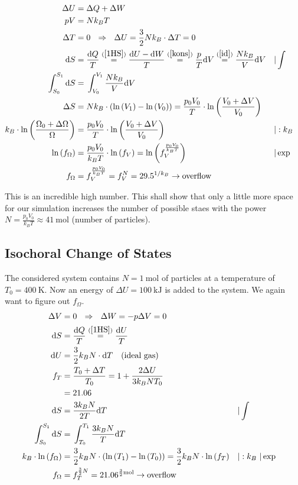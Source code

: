 \documentclass[11pt,a4paper]{scrartcl}
\newcommand{\dd}{\text{d}} 							%
\newcommand{\D}{\Delta} 								%
\newcommand{\Ln}[1]{\text{ln}\left( #1 \right)}			%
\newcommand{\eref}[1]{(\ref{#1})}						%
\begin{document}
\begin{align}
\D U 
	=&\; \D Q + \D W
	\label{1HS}\\
pV 
	=&\; Nk_BT
	\label{id}\\
\D T 
	=&\; 0 
	\ \ \Rightarrow \ \ \D U 
	= \frac{3}{2}Nk_B\cdot \D T
	= 0
	\label{kons}\\
\dd S 
	=&\; \frac{\dd Q}{T} 
	\stackrel{\eref{1HS}}{=} \frac{\dd U-\dd W}{T} 
	\stackrel{\eref{kons}}{=} \frac{p}{T}\dd V 
	\stackrel{\eref{id}}{=} \frac{Nk_B}{V}\dd V 
	&&|\int
	\label{dS}\\
\int_{S_0}^{S_1} \dd S
	=&\; \int_{V_0}^{V_1}\frac{Nk_B}{V}\dd V
	\label{sint}\\
\D S 
	=&\; Nk_B\cdot\left(\Ln{V_1}-\Ln{V_0}\right) 
	=\frac{p_0V_0}{T}\cdot\Ln{\frac{V_0+\D V}{V_0}}
	\label{DS}\\
k_B\cdot \Ln{\frac{\Omega_0+\D \Omega}{\Omega}} 
	=&\;\frac{p_0V_0}{T}\cdot\Ln{\frac{V_0+\D V}{V_0}} 
	&&|:k_B
	\label{SO}\\
\Ln{f_\Omega} 
	=&\; \frac{p_0V_0}{k_BT}\cdot\Ln{f_V} 
	=\Ln{f_V^{\frac{p_0V_0}{k_BT}}} 
	&&|\exp
	\label{lnO}\\
f_\Omega 
	=&\; f_V^{\frac{p_0V_0}{k_BT}} 
	= f_V^N 
	= 29.5^{1/k_B} 
	\rightarrow \text{overflow}
	\label{Omega}
\end{align}

This is an incredible high number. 
This shall show that only a little more space for our simulation increases the number of possible staes with the power $N = \frac{p_0V_0}{k_BT}\approx\SI{41}{\mole}$ (number of particles). 

\subsection{Isochoral Change of States}

The considered system contains $N=\SI{1}{\mole}$ of particles at a temperature of $T_0=\SI{400}{\kelvin}$. Now an energy of $\D U =\SI{100}{\kilo\joule}$ is added to the system. We again want to figure out $f_\Omega$.
\begin{align}
\D V 
	=&\; 0
	\ \ \Rightarrow \ \ \D W 
	= -p \D V
	= 0
	\label{kons2}\\
\dd S
	=&\; \frac{\dd Q}{T}
	\stackrel{\eref{1HS}}{=} \frac{\dd U}{T}
	\label{dS2}\\
\dd U 
	=&\; \frac{3}{2}k_BN\cdot\dd T
	\ \ \ \text{(ideal gas)}
	\label{idU}\\
f_T 
	=&\; \frac{T_0+\D T}{T_0} 
	=1+\frac{2\D U}{3k_BNT_0}
	\label{fT1}\\
=&\; 21.06
	\label{fT2}\\
\dd S
	=&\; \frac{3k_BN}{2T}\dd T
	&&|\int
	\label{dSdT}\\
\int_{S_0}^{S_1} \dd S
	=&\; \int_{T_0}^{T_1}\frac{3k_BN}{T}\dd T
	\label{sint2}\\
k_B\cdot\Ln{f_\Omega}
	=&\; \frac{3}{2}k_BN\cdot\left(\Ln{T_1}-\Ln{T_0}\right) 
	= \frac{3}{2}k_BN\cdot\Ln{f_T}
	&&|:k_B\ |\exp
	\label{DO2}\\
f_\Omega 
	=&\; f_T^{\frac{3}{2}N}
	=21.06^{\frac{3}{2}\SI{}{\mole}}
	\rightarrow \text{overflow}
	\label{fO2}
\end{align}
\end{document}
